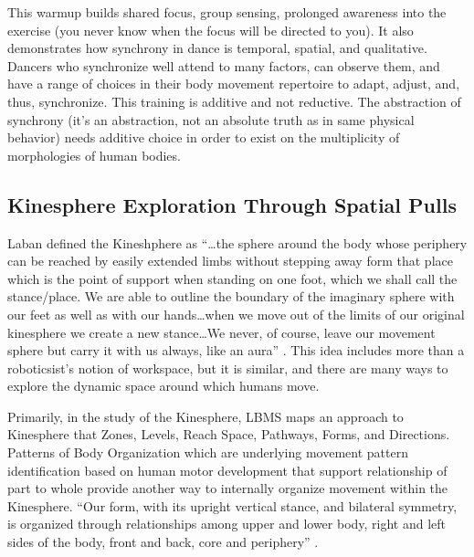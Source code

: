\documentclass[arts,article,submit,moreauthors,pdftex,10pt,a4paper]{mdpi}
\begin{document}
This warmup builds shared focus, group sensing, prolonged awareness into the exercise (you never know when the focus will be directed to you).
It also demonstrates how synchrony in dance is temporal, spatial, and qualitative. Dancers who synchronize well attend to many factors, can observe them, and have a range of choices in their body movement repertoire to adapt, adjust, and, thus, synchronize. This training is additive and not reductive.  The abstraction of synchrony (it's an abstraction, not an absolute truth as in same physical behavior) needs additive choice in order to exist on the multiplicity of morphologies of human bodies.




\subsection{Kinesphere Exploration Through Spatial Pulls}\label{spatialpulls} %

Laban defined the Kineshphere as ``…the sphere around the body whose periphery can be reached by easily extended limbs without stepping away form that place which is the point of support when standing on one foot, which we shall call the stance/place. We are able to outline the boundary of the imaginary sphere with our feet as well as with our hands…when we move out of the limits of our original kinesphere we create a new stance…We never, of course, leave our movement sphere but carry it with us always, like an aura'' \cite{von1966language}.
This idea includes more than a roboticsist's notion of workspace, but it is similar, and there are many ways to explore the dynamic space around which humans move. 

Primarily, in the study of the Kinesphere, LBMS maps an approach to Kinesphere that Zones, Levels, Reach Space, Pathways, Forms, and Directions.  Patterns of Body Organization which are underlying movement pattern identification based on human motor development that support relationship of part to whole provide another way to internally organize movement within the Kinesphere. ``Our form, with its upright vertical stance, and bilateral symmetry, is organized through relationships among upper and lower body, right and left sides of the body, front and back, core and periphery'' \cite{studd2013}.
\end{document}
